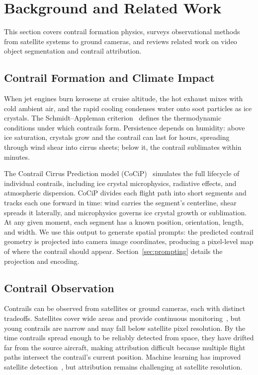 \documentclass[1p,11pt]{elsarticle}
\begin{document}
\section{Background and Related Work}

This section covers contrail formation physics, surveys observational methods from satellite systems to ground cameras, and reviews related work on video object segmentation and contrail attribution.

\subsection{Contrail Formation and Climate Impact}
\label{sec:contrail_formation}

When jet engines burn kerosene at cruise altitude, the hot exhaust mixes with cold ambient air, and the rapid cooling condenses water onto soot particles as ice crystals. The Schmidt--Appleman criterion~\cite{schmidt1941entstehung, appleman1953formation, Schumann1996} defines the thermodynamic conditions under which contrails form. Persistence depends on humidity: above ice saturation, crystals grow and the contrail can last for hours, spreading through wind shear into cirrus sheets; below it, the contrail sublimates within minutes.

The Contrail Cirrus Prediction model (CoCiP)~\cite{schumann2012cocip} simulates the full lifecycle of individual contrails, including ice crystal microphysics, radiative effects, and atmospheric dispersion. CoCiP divides each flight path into short segments and tracks each one forward in time: wind carries the segment's centerline, shear spreads it laterally, and microphysics governs ice crystal growth or sublimation. At any given moment, each segment has a known position, orientation, length, and width. We use this output to generate spatial prompts: the predicted contrail geometry is projected into camera image coordinates, producing a pixel-level map of where the contrail should appear. Section~\ref{sec:prompting} details the projection and encoding.

\subsection{Contrail Observation}
\label{sec:contrail_observation}

Contrails can be observed from satellites or ground cameras, each with distinct tradeoffs. Satellites cover wide areas and provide continuous monitoring~\cite{mannstein1999operational}, but young contrails are narrow and may fall below satellite pixel resolution. By the time contrails spread enough to be reliably detected from space, they have drifted far from the source aircraft, making attribution difficult because multiple flight paths intersect the contrail's current position. Machine learning has improved satellite detection~\cite{ng2023opencontrails}, but attribution remains challenging at satellite resolution.
\end{document}
